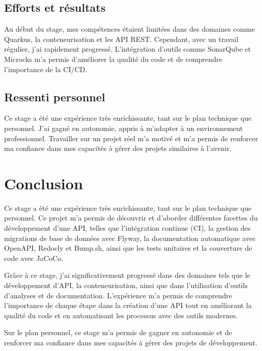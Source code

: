 \documentclass[11pt]{article}
\begin{document}
		\subsection*{Efforts et résultats}
		
		Au début du stage, mes compétences étaient limitées dans des domaines comme Quarkus, la conteneurisation et les API REST. Cependant, avec un travail régulier, j'ai rapidement progressé. L'intégration d'outils comme SonarQube et Microcks m'a permis d'améliorer la qualité du code et de comprendre l'importance de la CI/CD.
		
		\subsection*{Ressenti personnel}
		
		Ce stage a été une expérience très enrichissante, tant sur le plan technique que personnel. J'ai gagné en autonomie, appris à m'adapter à un environnement professionnel. Travailler sur un projet réel m'a motivé et m'a permis de renforcer ma confiance dans mes capacités à gérer des projets similaires à l'avenir.
		
	\section{Conclusion}
	
	Ce stage a été une expérience très enrichissante, tant sur le plan technique que personnel. Ce projet m'a permis de découvrir et d’aborder différentes facettes du développement d'une API, telles que l'intégration continue (CI), la gestion des migrations de base de données avec Flyway, la documentation automatique avec OpenAPI, Redocly et Bump.sh, ainsi que les tests unitaires et la couverture de code avec JaCoCo.
	
	\vspace{0.2cm}
	
	Grâce à ce stage, j’ai significativement progressé dans des domaines tels que le développement d'API, la conteneurisation, ainsi que dans l’utilisation d’outils d'analyses et de documentation. L'expérience m’a permis de comprendre l’importance de chaque étape dans la création d’une API tout en améliorant la qualité du code et en automatisant les processus avec des outils modernes.
	
	\vspace{0.2cm}
	
	Sur le plan personnel, ce stage m’a permis de gagner en autonomie et de renforcer ma confiance dans mes capacités à gérer des projets de développement.
	
\end{document}
